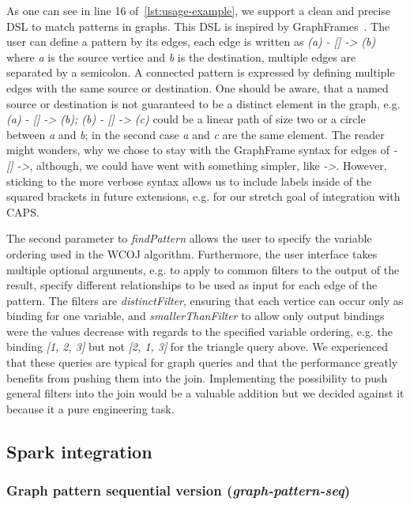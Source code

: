 As one can see in line 16 %
of~\cref{lst:usage-example}, we support a clean and precise DSL to match patterns in graphs.
This DSL is inspired by GraphFrames~\cite{graph-frames}.
The user can define a pattern by its edges, each edge is written as \textit{(a) - [] -> (b)} where \textit{a} is the
source vertice and \textit{b} is the destination, multiple edges are separated by a semicolon.
A connected pattern is expressed by defining multiple edges with the same source or destination.
One should be aware, that a named source or destination is not guaranteed to be a distinct element in the graph,
e.g. \textit{(a) - [] -> (b); (b) - [] -> (c)} could be a linear path of size two or a circle between \textit{a} and
\textit{b}; in the second case \textit{a} and \textit{c} are the same element.
The reader might wonders, why we chose to stay with the GraphFrame syntax for edges of
\textit{- [] ->}, although, we could have went with something simpler, like \textit{->}.
However, sticking to the more verbose syntax allows us to include labels inside of the squared brackets
in future extensions, e.g. for our stretch goal of integration with CAPS.

The second parameter to \textit{findPattern} allows the user to specify the variable ordering used in the WCOJ algorithm.
Furthermore, the user interface takes multiple optional arguments, e.g. to apply to common filters to the output of the result,
specify different relationships to be used as input for each edge of the pattern.
The filters are \textit{distinctFilter}, ensuring that each vertice can occur only as binding for one variable, and
\textit{smallerThanFilter} to allow only output bindings were the values decrease with regards to the specified variable ordering,
e.g. the binding \textit{[1, 2, 3]} but not \textit{[2, 1, 3]} for the triangle query above.
We experienced that these queries are typical for graph queries and that the performance greatly benefits from pushing
them into the join.
Implementing the possibility to push general filters into the join would be a valuable addition but we decided against it because
it a pure engineering task.


\subsection{Spark integration}\label{subsec:spark-integration}




\subsubsection{Graph pattern sequential version (\textit{graph-pattern-seq})}
